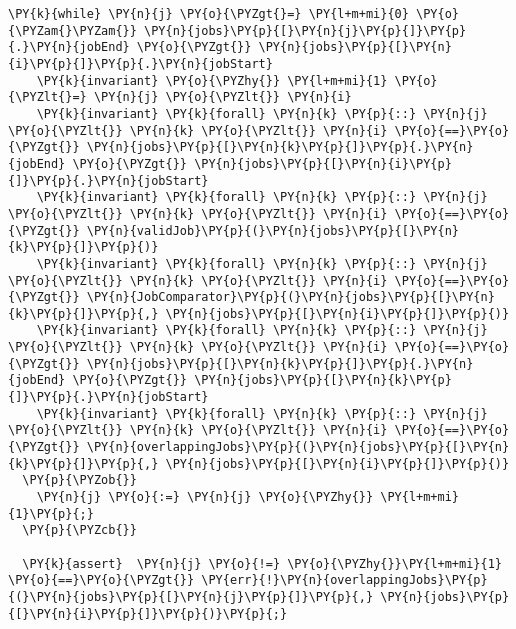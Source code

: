 \begin{Verbatim}[commandchars=\\\{\}, fontsize=\small]
  \PY{k}{while} \PY{n}{j} \PY{o}{\PYZgt{}=} \PY{l+m+mi}{0} \PY{o}{\PYZam{}\PYZam{}} \PY{n}{jobs}\PY{p}{[}\PY{n}{j}\PY{p}{]}\PY{p}{.}\PY{n}{jobEnd} \PY{o}{\PYZgt{}} \PY{n}{jobs}\PY{p}{[}\PY{n}{i}\PY{p}{]}\PY{p}{.}\PY{n}{jobStart} 
    \PY{k}{invariant} \PY{o}{\PYZhy{}} \PY{l+m+mi}{1} \PY{o}{\PYZlt{}=} \PY{n}{j} \PY{o}{\PYZlt{}} \PY{n}{i}
    \PY{k}{invariant} \PY{k}{forall} \PY{n}{k} \PY{p}{::} \PY{n}{j} \PY{o}{\PYZlt{}} \PY{n}{k} \PY{o}{\PYZlt{}} \PY{n}{i} \PY{o}{==}\PY{o}{\PYZgt{}} \PY{n}{jobs}\PY{p}{[}\PY{n}{k}\PY{p}{]}\PY{p}{.}\PY{n}{jobEnd} \PY{o}{\PYZgt{}} \PY{n}{jobs}\PY{p}{[}\PY{n}{i}\PY{p}{]}\PY{p}{.}\PY{n}{jobStart} 
    \PY{k}{invariant} \PY{k}{forall} \PY{n}{k} \PY{p}{::} \PY{n}{j} \PY{o}{\PYZlt{}} \PY{n}{k} \PY{o}{\PYZlt{}} \PY{n}{i} \PY{o}{==}\PY{o}{\PYZgt{}} \PY{n}{validJob}\PY{p}{(}\PY{n}{jobs}\PY{p}{[}\PY{n}{k}\PY{p}{]}\PY{p}{)}
    \PY{k}{invariant} \PY{k}{forall} \PY{n}{k} \PY{p}{::} \PY{n}{j} \PY{o}{\PYZlt{}} \PY{n}{k} \PY{o}{\PYZlt{}} \PY{n}{i} \PY{o}{==}\PY{o}{\PYZgt{}} \PY{n}{JobComparator}\PY{p}{(}\PY{n}{jobs}\PY{p}{[}\PY{n}{k}\PY{p}{]}\PY{p}{,} \PY{n}{jobs}\PY{p}{[}\PY{n}{i}\PY{p}{]}\PY{p}{)}
    \PY{k}{invariant} \PY{k}{forall} \PY{n}{k} \PY{p}{::} \PY{n}{j} \PY{o}{\PYZlt{}} \PY{n}{k} \PY{o}{\PYZlt{}} \PY{n}{i} \PY{o}{==}\PY{o}{\PYZgt{}} \PY{n}{jobs}\PY{p}{[}\PY{n}{k}\PY{p}{]}\PY{p}{.}\PY{n}{jobEnd} \PY{o}{\PYZgt{}} \PY{n}{jobs}\PY{p}{[}\PY{n}{k}\PY{p}{]}\PY{p}{.}\PY{n}{jobStart} 
    \PY{k}{invariant} \PY{k}{forall} \PY{n}{k} \PY{p}{::} \PY{n}{j} \PY{o}{\PYZlt{}} \PY{n}{k} \PY{o}{\PYZlt{}} \PY{n}{i} \PY{o}{==}\PY{o}{\PYZgt{}} \PY{n}{overlappingJobs}\PY{p}{(}\PY{n}{jobs}\PY{p}{[}\PY{n}{k}\PY{p}{]}\PY{p}{,} \PY{n}{jobs}\PY{p}{[}\PY{n}{i}\PY{p}{]}\PY{p}{)}
  \PY{p}{\PYZob{}}
    \PY{n}{j} \PY{o}{:=} \PY{n}{j} \PY{o}{\PYZhy{}} \PY{l+m+mi}{1}\PY{p}{;}
  \PY{p}{\PYZcb{}}

  \PY{k}{assert}  \PY{n}{j} \PY{o}{!=} \PY{o}{\PYZhy{}}\PY{l+m+mi}{1} \PY{o}{==}\PY{o}{\PYZgt{}} \PY{err}{!}\PY{n}{overlappingJobs}\PY{p}{(}\PY{n}{jobs}\PY{p}{[}\PY{n}{j}\PY{p}{]}\PY{p}{,} \PY{n}{jobs}\PY{p}{[}\PY{n}{i}\PY{p}{]}\PY{p}{)}\PY{p}{;}


\end{Verbatim}
